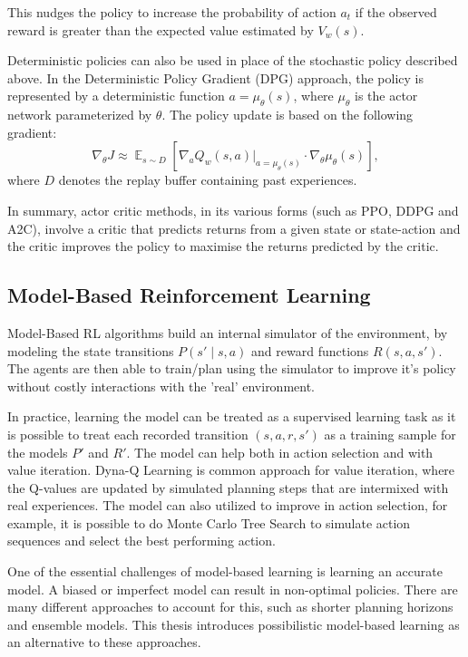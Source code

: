 \documentclass[11pt,a4paper]{report}
\DeclareMathOperator{\EX}{\mathbb{E}}
\begin{document}
This nudges the policy to increase the probability of action $a_t$ if the observed reward is greater than the expected value estimated by $V_w(s)$. \par

Deterministic policies can also be used in place of the stochastic policy described above. In the Deterministic Policy Gradient (DPG) approach, the policy is represented by a deterministic function \( a = \mu_\theta(s) \), where \(\mu_\theta\) is the actor network parameterized by \(\theta\). The policy update is based on the following gradient:
\[
  \nabla_\theta J \approx \EX_{s \sim D}\left[\nabla_a Q_w(s,a)\big|_{a=\mu_\theta(s)} \cdot \nabla_\theta \mu_\theta(s)\right],
\]
where \( D \) denotes the replay buffer containing past experiences.

In summary, actor critic methods, in its various forms (such as PPO, DDPG and A2C), involve a critic that predicts returns from a given state or state-action and the critic improves the policy to maximise the returns predicted by the critic. 

\subsection{Model-Based Reinforcement Learning}
Model-Based RL algorithms build an internal simulator of the environment, by modeling the state transitions $P(s' \mid s,a)$ and reward functions $R(s,a,s')$. The agents are then able to train/plan using the simulator to improve it's policy without costly interactions with the 'real' environment. 
 \par In practice, learning the model can be treated as a supervised learning task as it is possible to treat each recorded transition $(s, a, r, s')$ as a training sample for the models $P'$ and $R'$. The model can help both in action selection and with value iteration. Dyna-Q Learning is common approach for value iteration, where the Q-values are updated by simulated planning steps that are intermixed with real experiences. The model can also utilized to improve in action selection, for example, it is possible to do Monte Carlo Tree Search to simulate action sequences and select the best performing action.\par

One of the essential challenges of model-based learning is learning an accurate model. A biased or imperfect model can result in non-optimal policies. There are many different approaches to account for this, such as shorter planning horizons and ensemble models. This thesis introduces possibilistic model-based learning as an alternative to these approaches.
\end{document}
